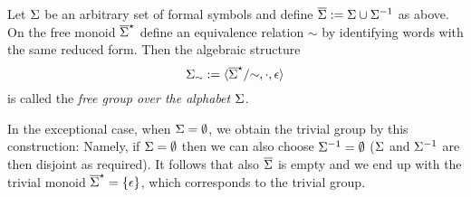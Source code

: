 \begin{definition}
\label{dfn_FreeGroup}
Let $\Sigma$ be an arbitrary set of formal symbols and define $\overline{\Sigma} := \Sigma \cup {\Sigma}^{-1}$ as above. On the free monoid ${\overline{\Sigma}}^{\star}$ define an equivalence relation $\sim$ by identifying words with the same reduced form. Then the algebraic structure 
\begin{equation}
\label{eqn_FreeGrp}
{\Sigma}_{\sim} := \langle {\overline{\Sigma}}^{\star}/{\sim}, \cdot, \epsilon \rangle
\end{equation}
is called the \emph{free group over the alphabet $\Sigma$}.
\end{definition}

\begin{remark}
In the exceptional case, when $\Sigma = \emptyset$,  we obtain the trivial group by this construction: Namely, if $\Sigma = \emptyset$ then we can also choose ${\Sigma}^{-1} = \emptyset$ ($\Sigma$ and ${\Sigma}^{-1}$ are then disjoint as required). It follows that also $\overline{\Sigma}$ is empty and we end up with the trivial monoid ${\overline{\Sigma}}^{\star} = \{\epsilon\}$, which corresponds to the trivial group.
\end{remark}


